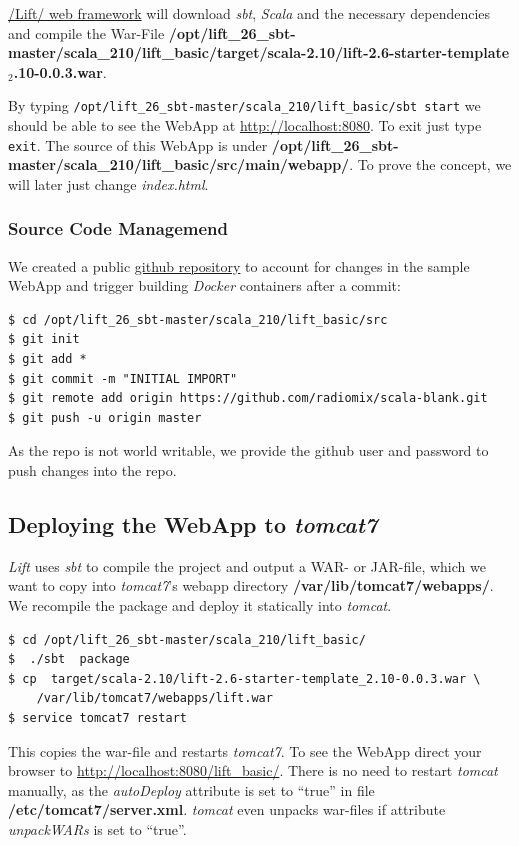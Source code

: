 \documentclass[captions=tableheading]{article}
\begin{document}
\href{http:///Lift/web.net/getting_started}{/Lift/ web framework}  will download \emph{sbt}, \emph{Scala} and the necessary dependencies and compile the War-File \textbf{/opt/lift\_26\_sbt-master/scala\_210/lift\_basic/target/scala-2.10/lift-2.6-starter-template$_2$.10-0.0.3.war}. 
 
By typing \texttt{/opt/lift\_26\_sbt-master/scala\_210/lift\_basic/sbt  start} we should be able to see the WebApp at \href{http://localhost:8080}{http://localhost:8080}. To exit just type \texttt{exit}. The source of this WebApp is under \textbf{/opt/lift\_26\_sbt-master/scala\_210/lift\_basic/src/main/webapp/}. To prove the concept, we will later just change \emph{index.html}.
\subsubsection{Source Code Managemend}
\label{sec-4-3-3}

We created a public  \href{https://github.com/radiomix/scala-basic.git}{github repository} to account for changes in the sample WebApp and trigger building \emph{Docker} containers after a commit:

\begin{verbatim}
$ cd /opt/lift_26_sbt-master/scala_210/lift_basic/src
$ git init
$ git add *
$ git commit -m "INITIAL IMPORT"
$ git remote add origin https://github.com/radiomix/scala-blank.git
$ git push -u origin master
\end{verbatim}
As the repo is not world writable, we provide the github user and password to push changes into the repo.
\subsection{Deploying the WebApp to \emph{tomcat7}}
\label{sec-4-4}

\emph{Lift} uses \emph{sbt} to compile the project and output a WAR- or JAR-file, which we want to copy into \emph{tomcat7}'s webapp directory \textbf{/var/lib/tomcat7/webapps/}. We recompile the package and deploy it statically into \emph{tomcat}.

\begin{verbatim}
$ cd /opt/lift_26_sbt-master/scala_210/lift_basic/
$  ./sbt  package
$ cp  target/scala-2.10/lift-2.6-starter-template_2.10-0.0.3.war \
    /var/lib/tomcat7/webapps/lift.war
$ service tomcat7 restart
\end{verbatim}
This copies the war-file and restarts \emph{tomcat7}. To see the WebApp direct your browser to \href{http://localhost:8080/lift_basic/}{http://localhost:8080/lift\_basic/}. There is no need to restart \emph{tomcat} manually, as the \emph{autoDeploy} attribute is set to ``true'' in file \textbf{/etc/tomcat7/server.xml}. \emph{tomcat} even unpacks war-files if attribute \emph{unpackWARs} is set to ``true''.
\end{document}
